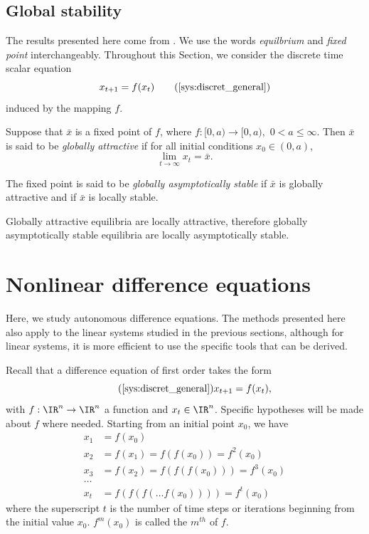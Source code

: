 \subsection{Global stability}
\label{sec:global_stability}
The results presented here come from \cite{Allen2007}. We use the words \emph{equilbrium} and \emph{fixed point} interchangeably. Throughout this Section, we consider the discrete time scalar equation
\begin{equation}
x_{t+1}=f(x_t) \tag{\ref{sys:discret_general}}
\end{equation}
induced by the mapping $f$.

\begin{definition}
Suppose that $\bar x$ is a fixed point of $f$,
where $f: [0,a)\rightarrow [0,a),$ $0<a\leq \infty$. Then $\bar x$ is said to be \emph{globally attractive} if for all initial conditions $x_0\in (0,a)$, $$\lim_{t\rightarrow \infty}x_t=\bar x.$$
\end{definition}

\begin{definition}
The fixed point is said to be \emph{globally asymptotically stable} if $\bar x$ is globally attractive and if $\bar x$ is locally stable.
\end{definition}
Globally attractive equilibria are locally attractive, therefore globally asymptotically stable equilibria are locally asymptotically stable.






\section{Nonlinear difference equations}
Here, we study autonomous difference equations. The methods presented here also apply to the linear systems studied in the previous sections, although for linear systems, it is more efficient to use the specific tools that can be derived.

Recall that a difference equation of first order takes the form
\begin{equation}\tag{\ref{sys:discret_general}}
x_{t+1}=f(x_t),
\end{equation}
with $f:\IR^n\to\IR^n$ a function and $x_t\in\IR^n$. Specific hypotheses will be made about $f$ where needed.
Starting from an initial point $x_0$, we have
\begin{align*}
x_1 &= f(x_0) \\
x_2 &= f(x_1)=f(f(x_0))=f^2(x_0) \\
x_3 &= f(x_2)=f(f(f(x_0)))=f^3(x_0) \\
\ldots &\\
x_t &= f(f(f(\dots f(x_0))))=f^t(x_0)
\end{align*}
where the superscript $t$ is the number of time steps or iterations beginning from the initial value $x_0$. $f^m(x_0)$ is called the $m^{th}$  of $f$.

